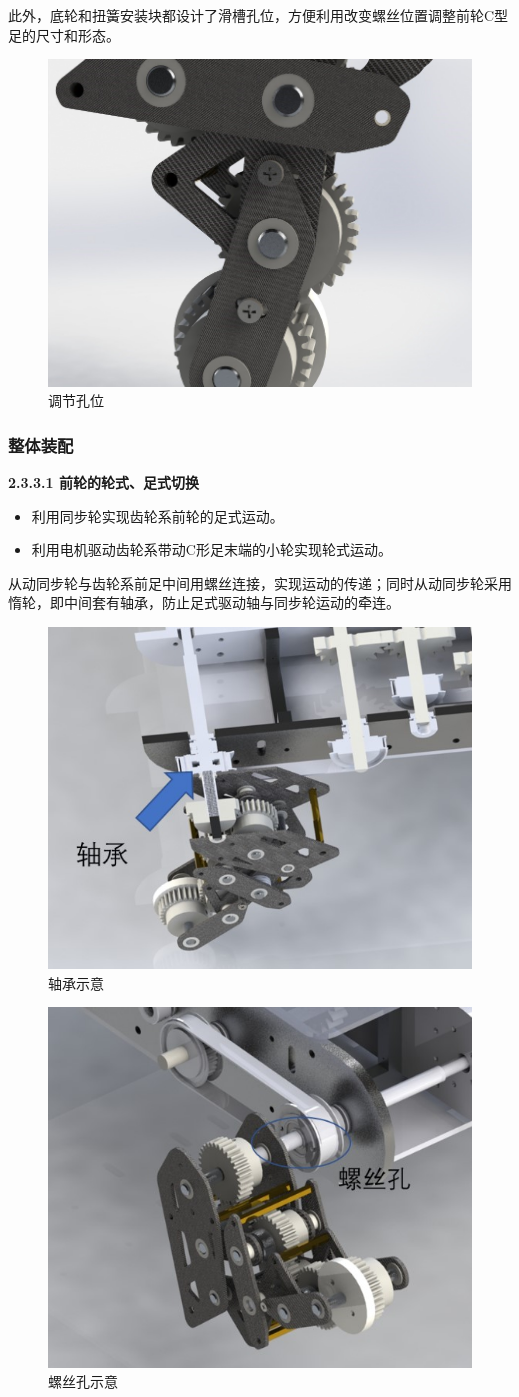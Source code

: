 \documentclass[12pt]{article}
\begin{document}
\begin{CJK}{UTF8}{song}
此外，底轮和扭簧安装块都设计了滑槽孔位，方便利用改变螺丝位置调整前轮C型足的尺寸和形态。
 \begin{figure}[H]
\centering
\includegraphics[width=.6\textwidth]{chap2//figk.jpg}
\caption{调节孔位}
\end{figure}
\subsubsection{整体装配}
\textbf{2.3.3.1	前轮的轮式、足式切换}\par
\begin{itemize}
\item 利用同步轮实现齿轮系前轮的足式运动。
\item 利用电机驱动齿轮系带动C形足末端的小轮实现轮式运动。
\end{itemize}
从动同步轮与齿轮系前足中间用螺丝连接，实现运动的传递；同时从动同步轮采用惰轮，即中间套有轴承，防止足式驱动轴与同步轮运动的牵连。
 \begin{figure}[H]
\centering
\includegraphics[width=.6\textwidth]{chap2//fig21.jpg}
\caption{轴承示意}
\end{figure}
 \begin{figure}[H]
\centering
\includegraphics[width=.6\textwidth]{chap2//fig22.jpg}
\caption{螺丝孔示意}
\end{figure}


\end{CJK}
\end{document}
